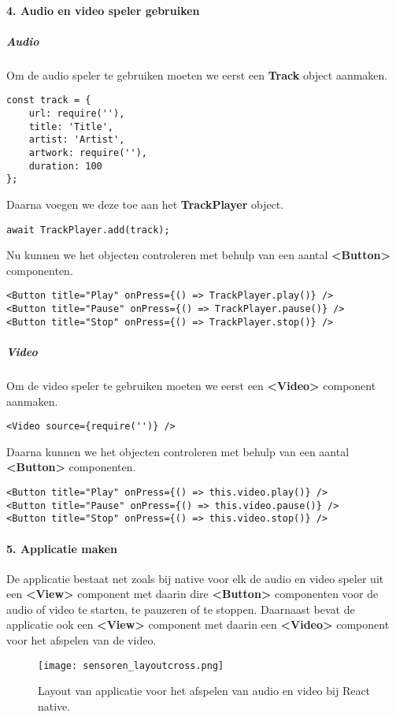 \paragraph{4. Audio en video speler gebruiken}
\subparagraph{Audio}
Om de audio speler te gebruiken moeten we eerst een \textbf{Track} object aanmaken.
\begin{verbatim}
const track = {
    url: require(''),
    title: 'Title',
    artist: 'Artist',
    artwork: require(''),
    duration: 100
};
\end{verbatim}
Daarna voegen we deze toe aan het \textbf{TrackPlayer} object.
\begin{verbatim}
await TrackPlayer.add(track);
\end{verbatim}
Nu kunnen we het objecten controleren met behulp van een aantal \textbf{<Button>} componenten.
\begin{verbatim}
<Button title="Play" onPress={() => TrackPlayer.play()} />
<Button title="Pause" onPress={() => TrackPlayer.pause()} />
<Button title="Stop" onPress={() => TrackPlayer.stop()} />
\end{verbatim}

\subparagraph{Video}
Om de video speler te gebruiken moeten we eerst een \textbf{<Video>} component aanmaken.
\begin{verbatim}
<Video source={require('')} />
\end{verbatim}
Daarna kunnen we het objecten controleren met behulp van een aantal \textbf{<Button>} componenten.
\begin{verbatim}
<Button title="Play" onPress={() => this.video.play()} />
<Button title="Pause" onPress={() => this.video.pause()} />
<Button title="Stop" onPress={() => this.video.stop()} />
\end{verbatim}

\paragraph{5. Applicatie maken}
De applicatie bestaat net zoals bij native voor elk de audio en video speler uit een \textbf{<View>}
component met daarin dire \textbf{<Button>} componenten voor de audio of video te starten, te pauzeren
of te stoppen. Daarnaast bevat de applicatie ook een \textbf{<View>} component met daarin een
\textbf{<Video>} component voor het afspelen van de video.
\begin{figure}[H]
    \centering
    \texttt{[image: sensoren\_layoutcross.png]}
    \caption{Layout van applicatie voor het afspelen van audio en video bij React native.}
\end{figure}


